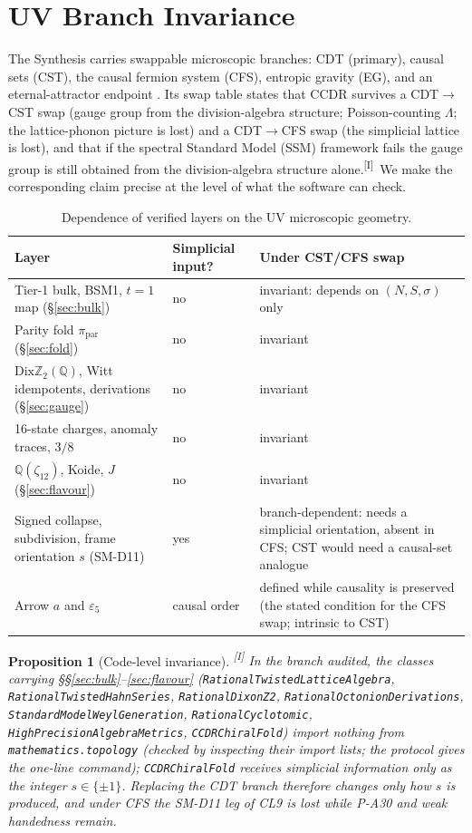 \documentclass[11pt,a4paper]{article}
\newtheorem{proposition}[theorem]{Proposition}
\theoremstyle{definition}
\theoremstyle{remark}
\newcommand{\DZ}{\mathrm{Dix}\mathbb{Z}_2(\mathbb{Q})}
\newcommand{\code}[1]{\texttt{#1}}
\newcommand{\tI}{\textsuperscript{[I]}}
\begin{document}
\section{UV Branch Invariance}\label{sec:uv}
The Synthesis carries swappable microscopic branches: CDT (primary), causal sets (CST), the causal fermion system (CFS), entropic gravity (EG), and an eternal-attractor endpoint \cite{BLMS,Finster,Jacobson,Verlinde}. Its swap table states that CCDR survives a CDT$\to$CST swap (gauge group from the division-algebra structure; Poisson-counting $\Lambda$; the lattice-phonon picture is lost) and a CDT$\to$CFS swap (the simplicial lattice is lost), and that if the spectral Standard Model (SSM) framework fails the gauge group is still obtained from the division-algebra structure alone.\tI\ We make the corresponding claim precise at the level of what the software can check.
\begin{table}[!htbp]
\centering\small
\begin{tabular}{@{}p{5.6cm}p{2.2cm}p{6.4cm}@{}}
\toprule
Layer & Simplicial input? & Under CST/CFS swap\\
\midrule
Tier-1 bulk, BSM1, $t=1$ map (\S\ref{sec:bulk}) & no & invariant: depends on $(N,S,\sigma)$ only\\
Parity fold $\pi_{\mathrm{par}}$ (\S\ref{sec:fold}) & no & invariant\\
$\DZ$, Witt idempotents, derivations (\S\ref{sec:gauge}) & no & invariant\\
16-state charges, anomaly traces, $3/8$ & no & invariant\\
$\mathbb{Q}(\zeta_{12})$, Koide, $J$ (\S\ref{sec:flavour}) & no & invariant\\
Signed collapse, subdivision, frame orientation $s$ (SM-D11) & yes & branch-dependent: needs a simplicial orientation, absent in CFS; CST would need a causal-set analogue\\
Arrow $a$ and $\varepsilon_5$ & causal order & defined while causality is preserved (the stated condition for the CFS swap; intrinsic to CST)\\
\bottomrule
\end{tabular}
\caption{Dependence of verified layers on the UV microscopic geometry.}\label{tab:branch}
\end{table}
\begin{sloppypar}
\begin{proposition}[Code-level invariance]\tI
In the branch audited, the classes carrying \S\S\ref{sec:bulk}--\ref{sec:flavour} (\code{RationalTwistedLatticeAlgebra}, \code{RationalTwistedHahnSeries}, \code{RationalDixonZ2}, \code{RationalOctonionDerivations}, \code{StandardModelWeylGeneration}, \code{RationalCyclotomic}, \code{HighPrecisionAlgebraMetrics}, \code{CCDRChiralFold}) import nothing from \code{mathematics.topology} (checked by inspecting their import lists; the protocol gives the one-line command); \code{CCDRChiralFold} receives simplicial information only as the integer $s\in\{\pm1\}$. Replacing the CDT branch therefore changes only how $s$ is produced, and under CFS the SM-D11 leg of CL9 is lost while P-A30 and weak handedness remain.
\end{proposition}
\end{sloppypar}
\end{document}
